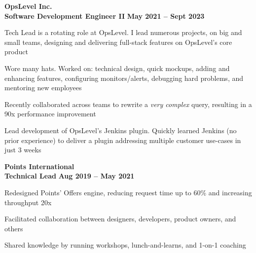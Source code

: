\documentclass[margin,line]{resume}
\begin{document}
\begin{resume}
    \hspace{-3mm}\textbf{\listing OpsLevel Inc.} \vspace{2mm}\\\vspace{1mm}
    \hspace{1.2mm}\textbf{Software Development Engineer II} \hfill \textbf{May 2021 -- Sept 2023}\vspace{1mm}
    \begin{list2}
        \item Tech Lead is a rotating role at OpsLevel. I lead numerous projects, on big and small teams, designing and delivering full-stack features on OpsLevel's core product
        \vspace{1mm}
        \item Wore many hats. Worked on: technical design, quick mockups, adding and enhancing features, configuring monitors/alerts, debugging hard problems, and mentoring new employees
        \vspace{1mm}
        \item Recently collaborated across teams to rewrite a \textit{very complex} query, resulting in a 90x performance improvement
        \vspace{1mm}
        \item Lead development of OpsLevel's Jenkins plugin. Quickly learned Jenkins (no prior experience) to deliver a plugin addressing multiple customer use-cases in just 3 weeks
    \end{list2}

    \hspace{-3mm}\textbf{\listing Points International} \vspace{2mm}\\\vspace{1mm}
    \hspace{1.2mm}\textbf{Technical Lead} \hfill \textbf{Aug 2019 -- May 2021}\vspace{1mm}
    \begin{list2}
        \item Redesigned Points’ Offers engine, reducing request time up to 60\% and increasing throughput 20x
        \vspace{1mm}
        \item Facilitated collaboration between designers, developers, product owners, and others
        \vspace{1mm}
        \item Shared knowledge by running workshops, lunch-and-learns, and 1-on-1 coaching
    \end{list2}


\end{resume}
\end{document}
